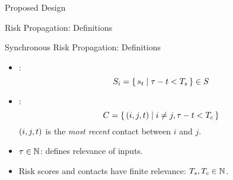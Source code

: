 \documentclass[11pt]{beamer}
\begin{document}
\begin{section}{Proposed Design}
\begin{frame}{Risk Propagation: Definitions}
\begin{figure}
\centering
{}
\end{figure}
\end{frame}

\begin{frame}{Synchronous Risk Propagation: Definitions}
\begin{itemize}
  \item {}:
    \begin{equation*}
      S_i =\set{ s_t | \tau- t< T_s} \in S
    \end{equation*}
    \pause
    \item {}:
      \begin{equation*}
        C = \set{ (i, j, t) | i \neq j, \tau- t< T_c}
      \end{equation*}
      $(i, j, t)$ is the \emph{most recent} contact between $i$ and $j$.
      \pause
      \item {} $\tau \in \mathbb{N}$: defines relevance of inputs.
      \pause
      \item Risk scores and contacts have finite relevance: $T_s, T_c \in \mathbb{N}$.
\end{itemize}
\end{frame}


\end{section}
\end{document}
